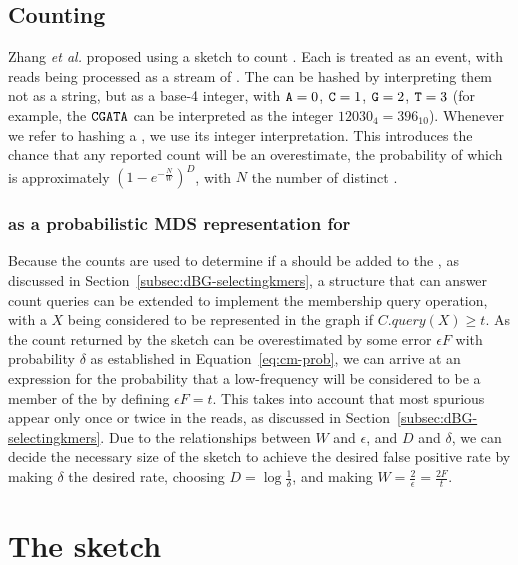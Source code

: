 \subsection{Counting }
\label{subsec:cm-countingkmers}

Zhang \emph{et al.} proposed using a \cm sketch to count  \cite{Zhang2014}. Each \kmer is treated as an event, with reads being processed as a stream of . The  can be hashed by interpreting them not as a string, but as a base-4 integer, with $\mathtt{A}=0$, $\mathtt{C}=1$, $\mathtt{G}=2$, $\mathtt{T}=3$ (for example, the \kmer $\mathtt{C}\mathtt{G}\mathtt{A}\mathtt{T}\mathtt{A}$ can be interpreted as the integer $12030_4 = 396_{10}$). Whenever we refer to hashing a \kmer, we use its integer interpretation. This introduces the chance that any reported count will be an overestimate, the probability of which is approximately $(1-e^{-\frac{N}{W}})^D$, with $N$ the number of distinct  \cite{Zhang2014}.

\subsubsection{\cm as a probabilistic MDS representation for }
\label{subsubsec:cm-dbg}

Because the \kmer counts are used to determine if a \kmer should be added to the \dBG, as discussed in Section~\ref{subsec:dBG-selectingkmers}, a structure that can answer count queries can be extended to implement the membership query operation, with a \kmer $X$ being considered to be represented in the graph if $C.\mathit{query}(X) \geq t$. As the count returned by the \cm sketch can be overestimated by some error $\epsilon F$ with probability $\delta$ as established in Equation~\ref{eq:cm-prob}, we can arrive at an expression for the probability that a low-frequency \kmer will be considered to be a member of the \dBG by defining $\epsilon F = t$. This takes into account that most spurious  appear only once or twice in the reads, as discussed in Section~\ref{subsec:dBG-selectingkmers}. Due to the relationships between $W$ and $\epsilon$, and $D$ and $\delta$, we can decide the necessary size of the \cm sketch to achieve the desired false positive rate by making $\delta$ the desired rate, choosing $D = \log \frac{1}{\delta}$, and making $W = \frac{2}{\epsilon} = \frac{2F}{t}$.

\section{The \dB\cm sketch}
\label{sec:debruijncountmin}

